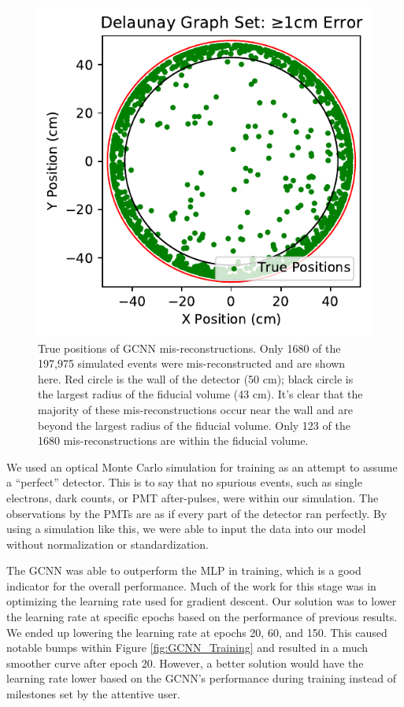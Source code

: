 \begin{figure}
	\centering
	\includegraphics[width=\linewidth]{figures/gcnn_Delaunay-Prenoise_1cm-err.pdf}
	\caption{
	True positions of GCNN mis-reconstructions.
	Only 1680 of the 197,975 simulated events were mis-reconstructed and are shown here.
	Red circle is the wall of the detector (50 cm); black circle is the largest radius of the fiducial volume (43 cm).
	It's clear that the majority of these mis-reconstructions occur near the wall and are beyond the largest radius of the fiducial volume.
	Only 123 of the 1680 mis-reconstructions are within the fiducial volume.
	}
	\label{fig:1cm_Counts}
\end{figure}
\par We used an optical Monte Carlo simulation for training as an attempt to assume a “perfect” detector.
This is to say that no spurious events, such as single electrons, dark counts, or PMT after-pulses, were within our simulation.
The observations by the PMTs are as if every part of the detector ran perfectly.
By using a simulation like this, we were able to input the data into our model without normalization or standardization.
\par The GCNN was able to outperform the MLP in training, which is a good indicator for the overall performance.
Much of the work for this stage was in optimizing the learning rate used for gradient descent.
Our solution was to lower the learning rate  at specific epochs based on the performance of  previous results.
We ended up lowering the learning rate at epochs 20, 60, and 150.
This caused notable bumps within Figure \ref{fig:GCNN_Training} and resulted in a much smoother curve after epoch 20.
However, a better solution would have the learning rate lower based on the GCNN's performance during training instead of milestones set by the attentive user.
